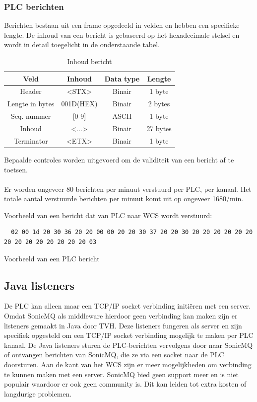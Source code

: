 \subsubsection{PLC berichten}
Berichten bestaan uit een frame opgedeeld in velden en hebben een specifieke lengte.
De inhoud van een bericht is gebaseerd op het hexadecimale stelsel en wordt in detail toegelicht in de onderstaande tabel.
\begin{table}[h!]
\centering 
\begin{tabular}{|c|c|c|c|}
  \hline
  \textbf{Veld} & \textbf{Inhoud} & \textbf{Data type} & \textbf{Lengte} \\
  \hline 
  Header & <STX> & Binair & 1 byte \\
  \hline 
  Lengte in bytes & 001D(HEX) & Binair & 2 bytes \\
  \hline 
  Seq. nummer &  [0-9] & ASCII & 1 byte  \\
  \hline 
  Inhoud & <...> & Binair & 27 bytes \\
  \hline 
  Terminator & <ETX> & Binair & 1 byte \\
  \hline
\end{tabular}
\caption[Message content]{\label{tab:message-content}Inhoud bericht}
\end{table}

Bepaalde controles worden uitgevoerd om de validiteit van een bericht af te toetsen. 
\\\\
Er worden ongeveer 80 berichten per minuut verstuurd per PLC, per kanaal.
Het totale aantal verstuurde berichten per minuut komt uit op ongeveer 1680/min.

Voorbeeld van een bericht dat van PLC naar WCS wordt verstuurd: 
\begin{listing}[h!]
\begin{verbatim}
  02 00 1d 20 30 36 20 20 00 00 20 20 30 37 20 20 30 20 20 20 20 20 20 20 20 20 20 20 20 20 20 03
\end{verbatim}
\caption[Voorbeeld PLC bericht]{\label{listing:message_example}Voorbeeld van een PLC bericht}
\end{listing}

\subsection{Java listeners}
De PLC kan alleen maar een TCP/IP socket verbinding initiëren met een server.
Omdat SonicMQ als middleware hierdoor geen verbinding kan maken zijn er listeners gemaakt in Java door TVH.
Deze listeners fungeren als server en zijn specifiek opgesteld om een TCP/IP socket verbinding mogelijk te maken per PLC kanaal.
De Java listeners sturen de PLC-berichten vervolgens door naar SonicMQ of ontvangen berichten van SonicMQ, 
die ze via een socket naar de PLC doorsturen.
Aan de kant van het WCS zijn er meer mogelijkheden om verbinding te kunnen maken met een server.
SonicMQ bied geen support meer en is niet populair waardoor er ook geen community is.
Dit kan leiden tot extra kosten of langdurige problemen.

